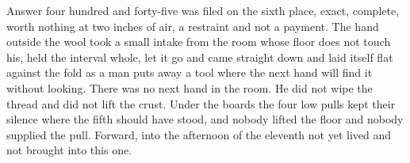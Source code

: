 Answer four hundred and forty-five was filed on the sixth place, exact, complete, worth nothing at two inches of air, a restraint and not a payment. The hand outside the wool took a small intake from the room whose floor does not touch his, held the interval whole, let it go and came straight down and laid itself flat against the fold as a man puts away a tool where the next hand will find it without looking. There was no next hand in the room. He did not wipe the thread and did not lift the crust. Under the boards the four low pulls kept their silence where the fifth should have stood, and nobody lifted the floor and nobody supplied the pull. Forward, into the afternoon of the eleventh not yet lived and not brought into this one.
